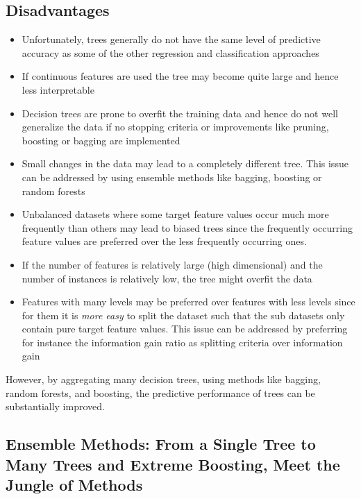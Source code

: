 \documentclass[%
oneside,                 %
final,                   %
10pt]{article}
\begin{document}
\noindent
\subsection{Disadvantages}

\begin{itemize}
\item Unfortunately, trees generally do not have the same level of predictive accuracy as some of the other regression and classification approaches

\item If continuous features are used the tree may become quite large and hence less interpretable

\item Decision trees are prone to overfit the training data and hence do not well generalize the data if no stopping criteria or improvements like pruning, boosting or bagging are implemented

\item Small changes in the data may lead to a completely different tree. This issue can be addressed by using ensemble methods like bagging, boosting or random forests

\item Unbalanced datasets where some target feature values occur much more frequently than others may lead to biased trees since the frequently occurring feature values are preferred over the less frequently occurring ones. 

\item If the number of features is relatively large (high dimensional) and the number of instances is relatively low, the tree might overfit the data

\item Features with many levels may be preferred over features with less levels since for them it is \emph{more easy} to split the dataset such that the sub datasets only contain pure target feature values. This issue can be addressed by preferring for instance the information gain ratio as splitting criteria over information gain
\end{itemize}

\noindent
However, by aggregating many decision trees, using methods like bagging, random forests, and boosting, the predictive performance of trees can be substantially improved. 


\subsection{Ensemble Methods: From a Single Tree to Many Trees and Extreme Boosting, Meet the Jungle of Methods}
\end{document}
